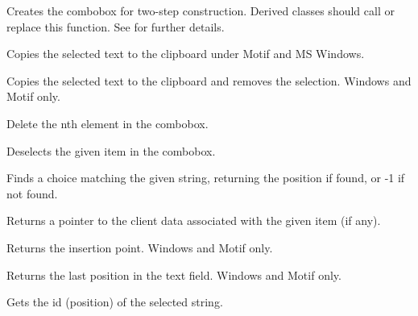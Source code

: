 Creates the combobox for two-step construction. Derived classes
should call or replace this function. See \rtfsp
for further details.



Copies the selected text to the clipboard under Motif and MS Windows.



Copies the selected text to the clipboard and removes the selection. Windows and Motif only.



Delete the nth element in the combobox.



Deselects the given item in the combobox.



Finds a choice matching the given string, returning the position if found, or
-1 if not found.



Returns a pointer to the client data associated with the given item (if any).



Returns the insertion point. Windows and Motif only.



Returns the last position in the text field. Windows and Motif only.



Gets the id (position) of the selected string.


